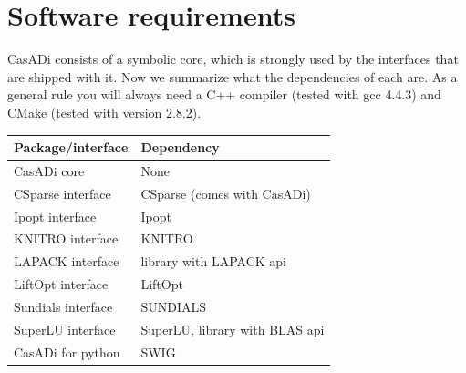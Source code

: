 \documentclass[a4paper,12pt]{book}
\begin{document}
\section{Software requirements}
CasADi consists of a symbolic core, which is strongly used by the interfaces that are shipped with it. Now we summarize
what the dependencies of each are. As a general rule you will always need a C++ compiler (tested with gcc 4.4.3) and
CMake (tested with version 2.8.2).
\begin{center}
\small
\begin{tabular}{|l|l|}
\hline
\textbf{Package/interface} & \textbf{Dependency}\\
\hline
CasADi core & None \\
\hline
CSparse interface & CSparse (comes with CasADi)\\
\hline
Ipopt interface & Ipopt\\
\hline
KNITRO interface & KNITRO\\
\hline
LAPACK interface & library with LAPACK api\\
\hline
LiftOpt interface & LiftOpt\\
\hline
Sundials interface & SUNDIALS \\
\hline
SuperLU interface & SuperLU, library with BLAS api\\
\hline
CasADi for python & SWIG \\
\hline
\end{tabular}
\end{center}
\end{document}
